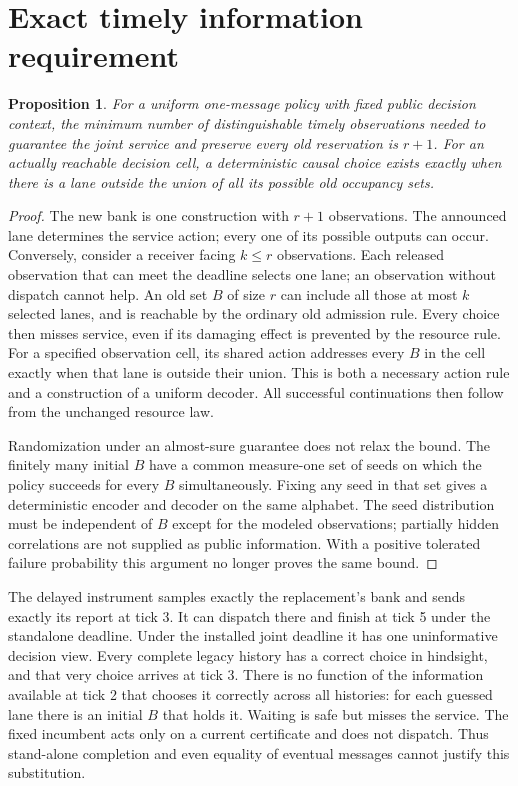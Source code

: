 \documentclass[11pt]{article}
\newtheorem{prop}{Proposition}
\begin{document}
\section{Exact timely information requirement}
\begin{prop}
For a uniform one-message policy with fixed public decision context, the minimum number of distinguishable timely observations needed to guarantee the joint service and preserve every old reservation is $r+1$. For an actually reachable decision cell, a deterministic causal choice exists exactly when there is a lane outside the union of all its possible old occupancy sets.
\end{prop}
\begin{proof}
The new bank is one construction with $r+1$ observations. The announced lane determines the service action; every one of its possible outputs can occur. Conversely, consider a receiver facing $k\le r$ observations. Each released observation that can meet the deadline selects one lane; an observation without dispatch cannot help. An old set $B$ of size $r$ can include all those at most $k$ selected lanes, and is reachable by the ordinary old admission rule. Every choice then misses service, even if its damaging effect is prevented by the resource rule. For a specified observation cell, its shared action addresses every $B$ in the cell exactly when that lane is outside their union. This is both a necessary action rule and a construction of a uniform decoder. All successful continuations then follow from the unchanged resource law.

Randomization under an almost-sure guarantee does not relax the bound. The finitely many initial $B$ have a common measure-one set of seeds on which the policy succeeds for every $B$ simultaneously. Fixing any seed in that set gives a deterministic encoder and decoder on the same alphabet. The seed distribution must be independent of $B$ except for the modeled observations; partially hidden correlations are not supplied as public information. With a positive tolerated failure probability this argument no longer proves the same bound.
\end{proof}

The delayed instrument samples exactly the replacement's bank and sends exactly its report at tick 3. It can dispatch there and finish at tick 5 under the standalone deadline. Under the installed joint deadline it has one uninformative decision view. Every complete legacy history has a correct choice in hindsight, and that very choice arrives at tick 3. There is no function of the information available at tick 2 that chooses it correctly across all histories: for each guessed lane there is an initial $B$ that holds it. Waiting is safe but misses the service. The fixed incumbent acts only on a current certificate and does not dispatch. Thus stand-alone completion and even equality of eventual messages cannot justify this substitution.
\end{document}
